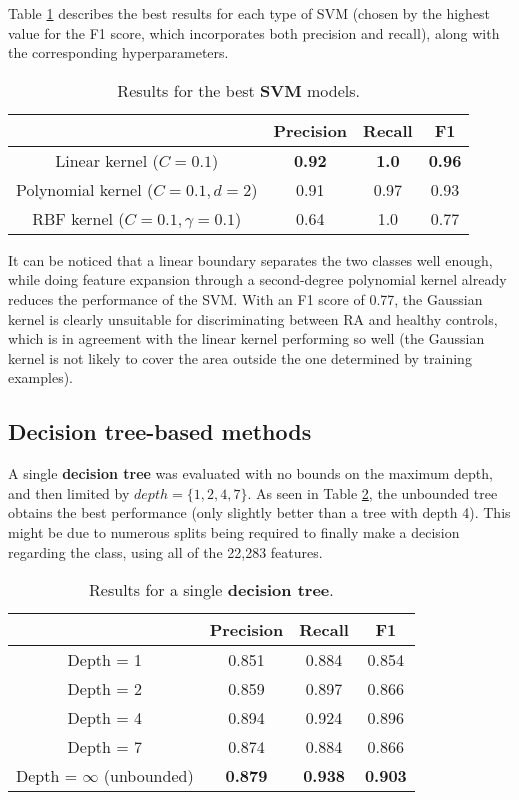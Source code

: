 \documentclass[11pt]{article}
\numberwithin{equation}{section}
\begin{document}
Table \ref{table:resSVM} describes the best results for each type of SVM (chosen by the highest value for the F1 score, which incorporates both precision and recall), along with the corresponding hyperparameters.
\begin{table}[h!]
\begin{center}
\begin{tabular}{ |c|c|c|c| } 
 \hline
  & Precision & Recall & F1 \\ 
 \hline
 Linear kernel ($C = 0.1$) & \bf{0.92} & \bf{1.0} & \bf{0.96} \\ 
 \hline
 Polynomial kernel ($C = 0.1, d = 2$) & 0.91 & 0.97 & 0.93 \\
 \hline
 RBF kernel ($C = 0.1, \gamma = 0.1$) & 0.64 & 1.0 & 0.77 \\ 
 \hline
\end{tabular}
\caption{Results for the best \textbf{SVM} models.}
\label{table:resSVM}
\end{center}
\end{table}

It can be noticed that a linear boundary separates the two classes well enough, while doing feature expansion through a second-degree polynomial kernel already reduces the performance of the SVM. With an F1 score of 0.77, the Gaussian kernel is clearly unsuitable for discriminating between RA and healthy controls, which is in agreement with the linear kernel performing so well (the Gaussian kernel is not likely to cover the area outside the one determined by training examples).

\subsection{Decision tree-based methods}

A single \textbf{decision tree} was evaluated with no bounds on the maximum depth, and then limited by $depth = \{1, 2, 4, 7\}$. As seen in Table \ref{table:resDT}, the unbounded tree obtains the best performance (only slightly better than a tree with depth 4). This might be due to numerous splits being required to finally make a decision regarding the class, using all of the 22,283 features.

\begin{table}[h!]
\begin{center}
\begin{tabular}{ |c|c|c|c| } 
 \hline
  & Precision & Recall & F1 \\ 
 \hline
 Depth = 1 & 0.851 & 0.884 & 0.854 \\
 \hline
 Depth = 2 & 0.859 & 0.897 & 0.866 \\ 
 \hline
 Depth = 4 & 0.894 & 0.924 & 0.896 \\ 
 \hline
 Depth = 7 & 0.874 & 0.884 & 0.866 \\ 
 \hline
 Depth = $\infty$ (unbounded) & \bf{0.879} & \bf{0.938} & \bf{0.903} \\ 
 \hline
\end{tabular}
\caption{Results for a single \textbf{decision tree}.}
\label{table:resDT}
\end{center}
\end{table}
\end{document}
